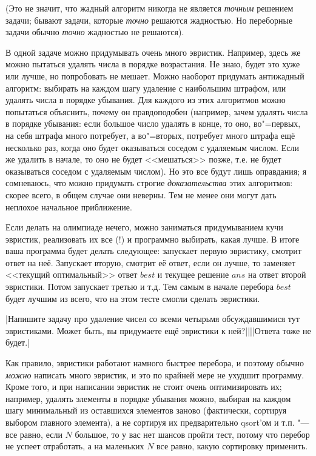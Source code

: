 (Это не значит, что жадный алгоритм никогда не является \textit{точным} решением задачи; бывают 
задачи, которые \textit{точно} решаются жадностью.
Но переборные задачи обычно \textit{точно} жадностью не решаются).

В одной задаче можно придумывать очень много эвристик. Например, здесь же можно пытаться 
удалять числа в порядке возрастания. Не знаю, будет это хуже или лучше, но попробовать не 
мешает. Можно наоборот придумать антижадный алгоритм: выбирать на каждом шагу удаление с 
наибольшим штрафом, или удалять числа в порядке убывания. Для каждого из этих алгоритмов можно попытаться объяснить, почему он правдоподобен (например, зачем удалять числа в порядке убывания: если большое число удалять в конце, то оно, во"=первых, на себя штрафа много потребует, а во"=вторых, потребует много штрафа ещё несколько раз, когда оно будет оказываться соседом с удаляемым числом. Если же удалить в начале, то оно не будет <<мешаться>> позже, т.е. не будет оказываться соседом с удаляемым числом). Но это все будут лишь оправдания; я сомневаюсь, что можно придумать строгие \textit{доказательства} этих алгоритмов: скорее всего, в общем случае они неверны. Тем не менее они могут дать неплохое начальное приближение.

Если делать на олимпиаде нечего, можно заниматься придумыванием кучи эвристик, реализовать их все (!) и программно выбирать, какая лучше. В итоге ваша программа будет делать следующее: запускает 
первую эвристику, смотрит ответ на неё. Запускает вторую, смотрит её ответ, если он лучше, то 
заменяет <<текущий оптимальный>> ответ $best$ и текущее решение $ans$ на ответ второй эвристики. Потом запускает третью и 
т.д. Тем самым в начале перебора $best$ будет лучшим из всего, что на этом тесте смогли сделать эвристики. 

\task|Напишите задачу про удаление чисел со всеми четырьмя обсуждавшимися тут эвристиками. Может 
быть, вы придумаете ещё эвристики к ней?||||Ответа тоже не будет.|\label{Numbers_four_heur}

Как правило, эвристики работают намного быстрее перебора, и поэтому обычно \textit{можно} написать много эвристик, и это по крайней мере не ухудшит программу. Кроме того, и при написании эвристик не стоит очень оптимизировать их; например, удалять элементы в порядке убывания можно, выбирая на каждом шагу минимальный из оставшихся элементов заново (фактически, сортируя выбором главного элемента), а не сортируя их предварительно qsort'ом и т.п. "--- все равно, если $N$ большое, то у 
вас нет шансов пройти тест, потому что перебор не успеет отработать, а на маленьких $N$ все равно, какую сортировку применить.

